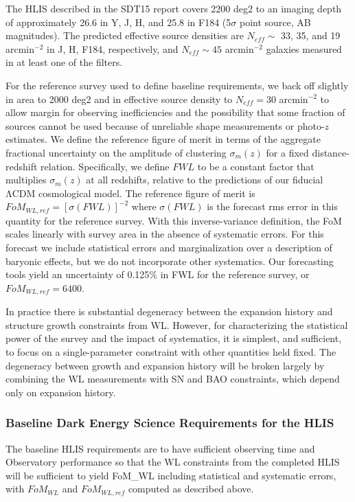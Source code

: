The HLIS described in the SDT15 report covers 2200 deg2  to an imaging depth of
approximately 26.6 in Y, J, H, and 25.8 in F184 (5$\sigma$ point source, AB
magnitudes).  The predicted effective source densities are $N_{eff} \sim$ 33, 35, and 19
arcmin$^{-2}$ in J, H, F184, respectively, and $N_{eff} \sim 45$ arcmin$^{-2}$ galaxies measured
in at least one of the filters.

For the reference survey used to define baseline requirements, we back off
slightly in area to 2000 deg2 and in effective source density to $N_{eff} = 30$
arcmin$^{-2}$ to allow margin for observing inefficiencies and the possibility that
some fraction of sources cannot be used because of unreliable shape measurements
or photo-$z$ estimates.  We define the reference figure of merit in terms of the
aggregate fractional uncertainty on the amplitude of clustering $\sigma_m(z)$ for a
fixed distance-redshift relation.  Specifically, we define $FWL$ to be a constant
factor that multiplies $\sigma_m(z)$ at all redshifts, relative to the predictions of
our fiducial ΛCDM cosmological model.  The reference figure of merit is
$FoM_{WL,ref} = [\sigma(FWL)]^{-2}$ where $\sigma(FWL)$ is the forecast rms error in this quantity for the reference
survey.  With this inverse-variance definition, the FoM scales linearly with
survey area in the absence of systematic errors.  For this forecast we include
statistical errors and marginalization over a description of baryonic effects,
but we do not incorporate other systematics.  Our forecasting tools yield an
uncertainty of 0.125\% in FWL for the reference survey, or $FoM_{WL,ref} = 6400$.

In practice there is substantial degeneracy between the expansion history and
structure growth constraints from WL.  However, for characterizing the
statistical power of the survey and the impact of systematics, it is simplest,
and sufficient, to focus on a single-parameter constraint with other quantities
held fixed.  The degeneracy between growth and expansion history will be broken
largely by combining the WL measurements with SN and BAO constraints, which
depend only on expansion history.

\subsubsection{Baseline  Dark Energy Science Requirements for the HLIS}

The baseline HLIS requirements are to have sufficient observing time and
Observatory performance so that the WL constraints from the completed HLIS will
be sufficient to yield
\bea
FoM_{WL} 
\eea
including statistical and systematic errors, with $FoM_{WL}$ and $FoM_{WL,ref}$ computed as described above.

